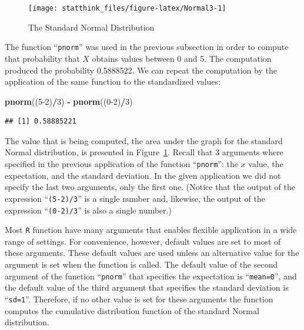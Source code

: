 \documentclass[]{krantz}
\makeatletter
\newenvironment{Shaded}{\begin{snugshade}}{\end{snugshade}}
\newcommand{\DecValTok}[1]{\textcolor[rgb]{0.00,0.00,0.81}{#1}}
\newcommand{\KeywordTok}[1]{\textcolor[rgb]{0.13,0.29,0.53}{\textbf{#1}}}
\newcommand{\NormalTok}[1]{#1}
\newcommand{\OperatorTok}[1]{\textcolor[rgb]{0.81,0.36,0.00}{\textbf{#1}}}
\newcommand{\StringTok}[1]{\textcolor[rgb]{0.31,0.60,0.02}{#1}}
\newenvironment{kframe}{%
\medskip{}
\setlength{\fboxsep}{.8em}
 \def\at@end@of@kframe{}%
 \ifinner\ifhmode%
  \def\at@end@of@kframe{\end{minipage}}%
  \begin{minipage}{\columnwidth}%
 \fi\fi%
 \def\FrameCommand##1{\hskip\@totalleftmargin \hskip-\fboxsep
 \colorbox{shadecolor}{##1}\hskip-\fboxsep
     \hskip-\linewidth \hskip-\@totalleftmargin \hskip\columnwidth}%
 \MakeFramed {\advance\hsize-\width
   \@totalleftmargin\z@ \linewidth\hsize
   \@setminipage}}%
 {\par\unskip\endMakeFramed%
 \at@end@of@kframe}
\renewenvironment{Shaded}{\begin{kframe}}{\end{kframe}}
\theoremstyle{definition}
\theoremstyle{definition}
\theoremstyle{definition}
\theoremstyle{remark}
\makeatother
\begin{document}
\begin{figure}

{\centering \texttt{[image: statthink\_files/figure-latex/Normal3-1]} 

}

\caption{The Standard Normal Distribution}\label{fig:Normal3}
\end{figure}

The function ``\texttt{pnorm}'' was used in the previous subsection in order to
compute that probability that \(X\) obtains values between 0 and 5. The
computation produced the probability 0.5888522. We can repeat the
computation by the application of the same function to the standardized
values:

\begin{Shaded}
\begin{Highlighting}[]
\KeywordTok{pnorm}\NormalTok{((}\DecValTok{5-2}\NormalTok{)}\OperatorTok{/}\DecValTok{3}\NormalTok{) }\OperatorTok{-}\StringTok{ }\KeywordTok{pnorm}\NormalTok{((}\DecValTok{0-2}\NormalTok{)}\OperatorTok{/}\DecValTok{3}\NormalTok{)}
\end{Highlighting}
\end{Shaded}

\begin{verbatim}
## [1] 0.58885221
\end{verbatim}

The value that is being computed, the area under the graph for the
standard Normal distribution, is presented in Figure~\ref{fig:Normal3}.
Recall that 3 arguments where specified in the previous application of
the function ``\texttt{pnorm}'': the \(x\) value, the expectation, and the standard
deviation. In the given application we did not specify the last two
arguments, only the first one. (Notice that the output of the expression
``\texttt{(5-2)/3}'' is a single number and, likewise, the output of the
expression ``\texttt{(0-2)/3}'' is also a single number.)

Most \texttt{R} function have many arguments that enables flexible application
in a wide range of settings. For convenience, however, default values
are set to most of these arguments. These default values are used unless
an alternative value for the argument is set when the function is
called. The default value of the second argument of the function
``\texttt{pnorm}'' that specifies the expectation is ``\texttt{mean=0}'', and the default
value of the third argument that specifies the standard deviation is
``\texttt{sd=1}''. Therefore, if no other value is set for these arguments the
function computes the cumulative distribution function of the standard
Normal distribution.
\end{document}
